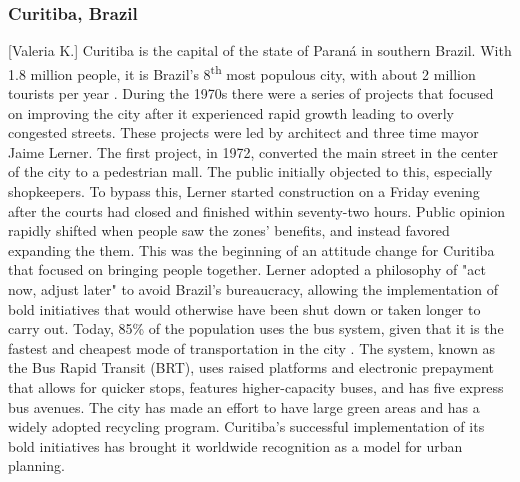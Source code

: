 \documentclass[12pt]{article}                       %
\begin{document}
\subsubsection{Curitiba, Brazil}[Valeria K.]
Curitiba is the capital of the state of Paraná in southern Brazil. With 1.8 million people, it is Brazil's 8\textsuperscript{th} most populous city, with about 2 million tourists per year \cite{Adler2016StoryCapital}. During the 1970s there were a series of projects that focused on improving the city after it experienced rapid growth leading to overly congested streets. These projects were led by architect and three time mayor Jaime Lerner. The first project, in 1972, converted the main street in the center of the city to a pedestrian mall. The public initially objected to this, especially shopkeepers. To bypass this, Lerner started construction on a Friday evening after the courts had closed and finished within seventy-two hours. Public opinion rapidly shifted when people saw the zones' benefits, and instead favored expanding the them. This was the beginning of an attitude change for Curitiba that focused on bringing people together. Lerner adopted a philosophy of "act now, adjust later" to avoid Brazil's bureaucracy, allowing the implementation of bold initiatives that would otherwise have been shut down or taken longer to carry out. Today, 85\% of the population uses the bus system, given that it is the fastest and cheapest mode of transportation in the city \cite{Adler2016StoryCapital}. The system, known as the Bus Rapid Transit (BRT), uses raised platforms and electronic prepayment that allows for quicker stops, features higher-capacity buses, and has five express bus avenues. The city has made an effort to have large green areas and has a widely adopted recycling program. Curitiba's successful implementation of its bold initiatives has brought it worldwide recognition as a model for urban planning.
\end{document}
